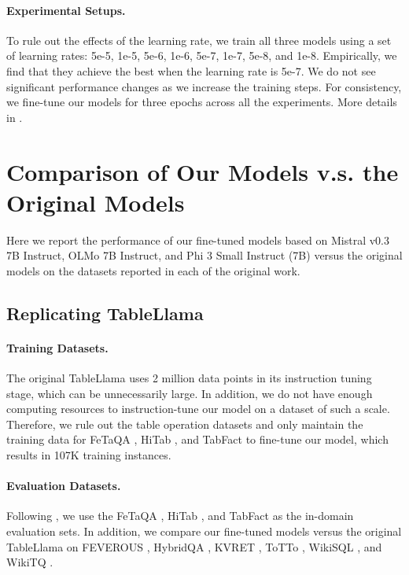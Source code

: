 \documentclass[11pt]{article}
\begin{document}
\paragraph{Experimental Setups.}
To rule out the effects of the learning rate, we train all three models using a set of learning rates: 5e-5, 1e-5, 5e-6, 1e-6, 5e-7, 1e-7, 5e-8, and 1e-8.
Empirically, we find that they achieve the best when the learning rate is 5e-7.
We do not see significant performance changes as we increase the training steps.
For consistency, we fine-tune our models for three epochs across all the experiments.
More details in .

\section{Comparison of Our Models v.s. the Original Models}
\label{sec: reimpl-compare}

Here we report the performance of our fine-tuned models based on Mistral v0.3 7B Instruct, OLMo 7B Instruct, and Phi 3 Small Instruct (7B) versus the original models on the datasets reported in each of the original work.

\subsection{Replicating TableLlama}
\label{subsec: reimpl-tablellama}

\paragraph{Training Datasets.} 
The original TableLlama \citep{zhang-etal-2024-tablellama} uses 2 million data points in its instruction tuning stage, which can be unnecessarily large.
In addition, we do not have enough computing resources to instruction-tune our model on a dataset of such a scale.
Therefore, we rule out the table operation datasets and only maintain the training data for FeTaQA \citep{nan-etal-2022-fetaqa}, HiTab \citep{cheng-etal-2022-hitab}, and TabFact \citep{chen2019tabfact} to fine-tune our model, which results in 107K training instances.

\paragraph{Evaluation Datasets.}
Following \citet{zhang-etal-2024-tablellama}, we use the FeTaQA \citep{nan-etal-2022-fetaqa}, HiTab \citep{cheng-etal-2022-hitab}, and TabFact \citep{chen2019tabfact} as the in-domain evaluation sets.
In addition, we compare our fine-tuned models versus the original TableLlama on FEVEROUS \citep{aly-etal-2021-fact}, HybridQA \citep{chen-etal-2020-hybridqa}, KVRET \citep{eric2017key}, ToTTo \citep{parikh-etal-2020-totto}, WikiSQL \citep{zhong2017seq2sql}, and WikiTQ \citep{pasupat-liang-2015-compositional}.
\end{document}
